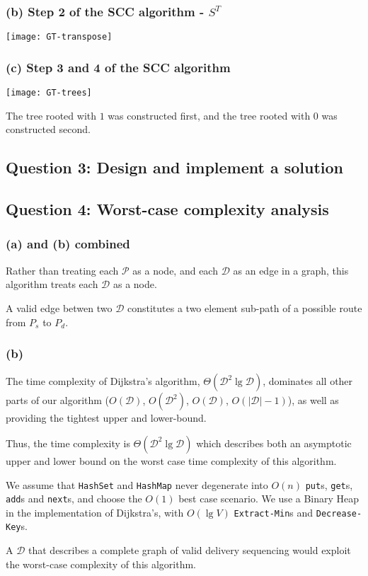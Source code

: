 \documentclass[11pt,a4paper]{article}
\begin{document}
\subsubsection*{(b) Step 2 of the SCC algorithm - $S^T$}

\texttt{[image: GT-transpose]}

\subsubsection*{(c) Step 3 and 4 of the SCC algorithm}

\texttt{[image: GT-trees]}

The tree rooted with $1$ was constructed first, and the tree rooted with $0$ was constructed second.

\newpage

\subsection*{Question 3: Design and implement a solution}

\subsection*{Question 4: Worst-case complexity analysis}


\subsubsection*{(a) and (b) combined}

Rather than treating each $\mathcal{P}$ as a node, and each $\mathcal{D}$ as an edge in a graph, this algorithm treats each $\mathcal{D}$ as a node. 

A valid edge betwen two $\mathcal{D}$ constitutes a two element sub-path of a possible route from $P_s$ to $P_d$.

\begingroup
\fontsize{11pt}{11pt}\selectfont
 
\endgroup

\subsubsection*{(b)}

The time complexity of Dijkstra's algorithm, $\Theta(\mathcal{D}^2 \lg \mathcal{D})$, dominates all other parts of our algorithm ($O(\mathcal{D})$, $O(\mathcal{D}^2)$, $O(\mathcal{D})$, $O(\vert\mathcal{D} \vert - 1)$), as well as providing the tightest upper and lower-bound.

Thus, the time complexity is $\Theta(\mathcal{D}^2 \lg \mathcal{D})$ which describes both an asymptotic upper and lower bound on the worst case time complexity of this algorithm.

We assume that \texttt{HashSet} and \texttt{HashMap} never degenerate into $O(n)$ \texttt{put}s, \texttt{get}s, \texttt{add}s and \texttt{next}s, and choose the $O(1)$ best case scenario. We use a Binary Heap in the implementation of Dijkstra's, with $O(\lg V)$ \texttt{Extract-Min}s and \texttt{Decrease-Key}s.

A $\mathcal{D}$ that describes a complete graph of valid delivery sequencing would exploit the worst-case complexity of this algorithm.
\end{document}
